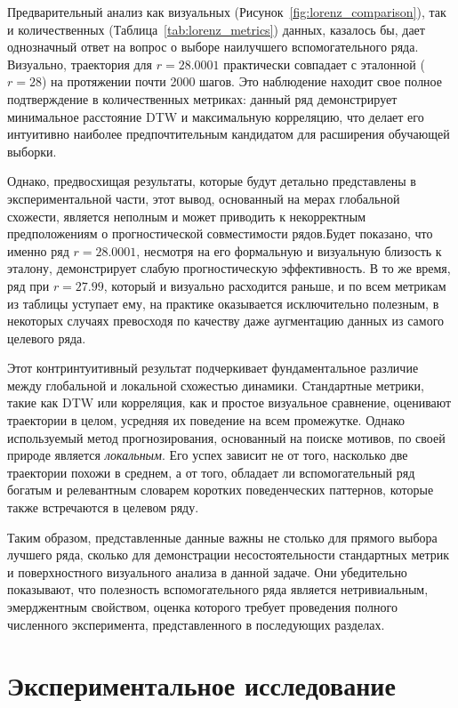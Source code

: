 \documentclass[a4paper,12pt]{extarticle}
\begin{document}
Предварительный анализ как визуальных (Рисунок~\ref{fig:lorenz_comparison}),
 так и количественных (Таблица~\ref{tab:lorenz_metrics}) данных, казалось
  бы, дает однозначный ответ на вопрос о выборе наилучшего вспомогательного
   ряда. Визуально, траектория для $r=28.0001$ практически совпадает с эталонной
    ($r=28$) на протяжении почти 2000 шагов. Это наблюдение находит свое полное
     подтверждение в количественных метриках: данный ряд демонстрирует минимальное
      расстояние DTW и максимальную корреляцию, что делает его интуитивно наиболее
      предпочтительным кандидатом для расширения обучающей выборки.

Однако, предвосхищая результаты, которые будут детально представлены в экспериментальной
 части, этот вывод, основанный на мерах глобальной схожести, является неполным 
 и может приводить к некорректным предположениям о прогностической совместимости рядов.Будет показано, что именно ряд $r=28.0001$,
 несмотря на его формальную и визуальную близость к эталону, демонстрирует слабую прогностическую
 эффективность. В то же время, ряд при $r=27.99$, который и визуально расходится раньше, и по
  всем метрикам из таблицы уступает ему, на практике оказывается исключительно полезным,
  в некоторых случаях превосходя по качеству даже аугментацию данных из самого целевого ряда.

Этот контринтуитивный результат подчеркивает фундаментальное различие между глобальной
 и локальной схожестью динамики. Стандартные метрики, такие как DTW или корреляция,
 как и простое визуальное сравнение, оценивают траектории в целом, усредняя их поведение
 на всем промежутке. Однако используемый метод прогнозирования, основанный на поиске мотивов,
  по своей природе является \textit{локальным}. Его успех зависит не от того, насколько две
  траектории похожи в среднем, а от того, обладает ли вспомогательный ряд богатым и релевантным
  словарем коротких поведенческих паттернов, которые также встречаются в целевом ряду.

Таким образом, представленные данные важны не столько для прямого выбора лучшего ряда,
сколько для демонстрации несостоятельности стандартных метрик и поверхностного визуального
анализа в данной задаче. Они убедительно показывают, что полезность вспомогательного ряда
является нетривиальным, эмерджентным свойством, оценка которого требует проведения полного
 численного эксперимента, представленного в последующих разделах.
\section{Экспериментальное исследование}
\end{document}
